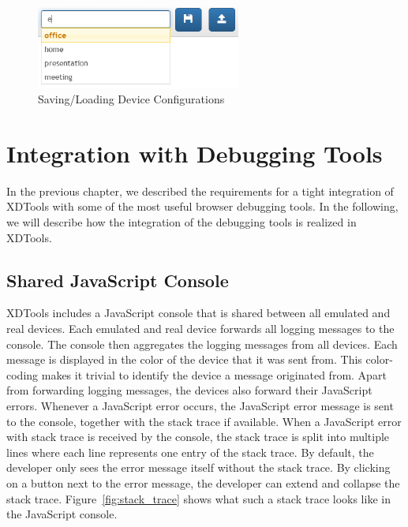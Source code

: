 \begin{figure}[H]
  \centering
    \includegraphics[width=0.6\textwidth]{images/screenshots/session_management_2.png}
	\caption[Screenshot: Saving/Loading device configurations]{Saving/Loading Device Configurations}
	\label{fig:session_management}
\end{figure}

\section{Integration with Debugging Tools}

In the previous chapter, we described the requirements for a tight integration of XDTools with some of the most useful browser debugging tools. In the following, we will describe how the integration of the debugging tools is realized in XDTools.

\subsection{Shared JavaScript Console}

XDTools includes a JavaScript console that is shared between all emulated and real devices. Each emulated and real device forwards all logging messages to the console. The console then aggregates the logging messages from all devices. Each message is displayed in the color of the device that it was sent from. This color-coding makes it trivial to identify the device a message originated from. Apart from forwarding logging messages, the devices also forward their JavaScript errors. Whenever a JavaScript error occurs, the JavaScript error message is sent to the console, together with the stack trace if available. When a JavaScript error with stack trace is received by the console, the stack trace is split into multiple lines where each line represents one entry of the stack trace. By default, the developer only sees the error message itself without the stack trace. By clicking on a button next to the error message, the developer can extend and collapse the stack trace. Figure~\ref{fig:stack_trace} shows what such a stack trace looks like in the JavaScript console.

